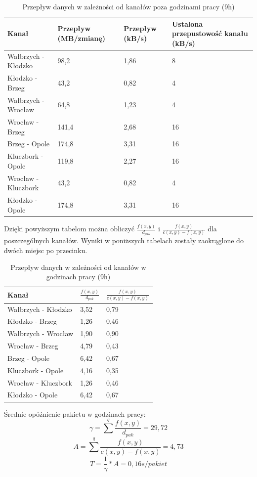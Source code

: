 \documentclass[a4paper]{article}
\begin{document}
\begin{table}[H]
	\centering
	\caption{Przepływ danych w zależności od kanałów poza godzinami pracy (9h)}
	\begin{tabular}{llll}
		\hline
		Kanał & Przepływ (MB/zmianę) & Przepływ (kB/s) & Ustalona przepustowość kanału (kB/s) \\
        \hline
Wałbrzych - Kłodzko&98,2&1,86&8\\
Kłodzko - Brzeg&43,2&0,82&4\\
Wałbrzych - Wrocław&64,8&1,23&4\\
Wrocław - Brzeg&141,4&2,68&16\\
Brzeg - Opole&174,8&3,31&16\\
Kluczbork - Opole&119,8&2,27&16\\
Wrocław - Kluczbork&43,2&0,82&4\\
Kłodzko - Opole&174,8&3,31&16\\

        \hline
	\end{tabular}	
\end{table}

Dzięki powyższym tabelom można obliczyć \(\frac{f(x,y)}{d_{pak}}  \) i \(  \frac{f(x,y)}{c(x,y) - f(x,y)}\) dla poszczególnych kanałów. Wyniki w poniższych tabelach zostały zaokrąglone do dwóch miejsc po przecinku.

\begin{table}[H]
	\centering
	\caption{Przepływ danych w zależności od kanałów w godzinach pracy (9h)}
	\begin{tabular}{lll}
		\hline
		Kanał & \(\frac{f(x,y)}{d_{pak}}  \) &  \(  \frac{f(x,y)}{c(x,y) - f(x,y)}\) \\
        \hline
Wałbrzych - Kłodzko & 3,52 & 0,79 \\
Kłodzko - Brzeg & 1,26 & 0,46 \\
Wałbrzych - Wrocław & 1,90 & 0,90 \\
Wrocław - Brzeg & 4,79 & 0,43\\
Brzeg - Opole & 6,42 & 0,67\\
Kluczbork - Opole & 4,16 & 0,35 \\
Wrocław - Kluczbork & 1,26 & 0,46\\
Kłodzko - Opole & 6,42 & 0,67 \\
        \hline
	\end{tabular}	
\end{table}

Średnie opóźnienie pakietu w godzinach pracy:
$$ \gamma = \sum_{}^{q} \frac{f(x,y)}{d_{pak}} = 29,72 $$
$$ A = \sum_{}^{q} \frac{f(x,y)}{c(x,y) - f(x,y)} = 4,73 $$
$$ T = \frac{1}{\gamma} * A = 0,16 s/pakiet $$
\end{document}
